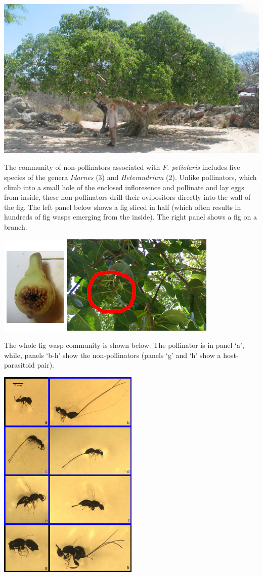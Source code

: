 \documentclass[]{article}
\begin{document}
\includegraphics{images/fig_tree.jpg}

The community of non-pollinators associated with \emph{F. petiolaris}
includes five species of the genera \emph{Idarnes} (3) and
\emph{Heterandrium} (2). Unlike pollinators, which climb into a small
hole of the enclosed infloresence and pollinate and lay eggs from
inside, these non-pollinators drill their ovipositors directly into the
wall of the fig. The left panel below shows a fig sliced in half (which
often results in hundreds of fig wasps emerging from the inside). The
right panel shows a fig on a branch.

\includegraphics{images/fruitbranch.png}

The whole fig wasp community is shown below. The pollinator is in panel
`a', while, panels `b-h' show the non-pollinators (panels `g' and `h'
show a host-parasitoid pair).

\includegraphics[width=0.5\textwidth,height=\textheight]{images/wasps.jpg}
\end{document}
